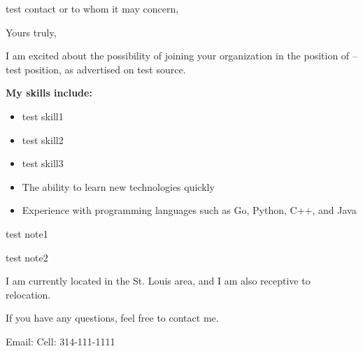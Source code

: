 

\date{\today}
\opening{test contact or to whom it may concern,}
\closing{Yours truly,}
\makelettertitle

\setlength{\parindent}{0pt}
\newcommand{\forceindent}{\leavevmode{\parindent=0.6cm\indent}}

I am excited about the possibility of joining your organization in the position of --test position, as advertised on test source.  \newline

\textbf{My skills include:}
\begin{itemize}
  \item test skill1
  \item test skill2
  \item test skill3
  \item The ability to learn new technologies quickly
  \item Experience with programming languages such as Go, Python, C++, and Java
\end{itemize}

test note1 \newline

test note2 \newline

I am currently located in the St. Louis area, and I am also receptive to relocation.

If you have any questions, feel free to contact me.

Email:  \newline
Cell: 314-111-1111

\makeletterclosing
